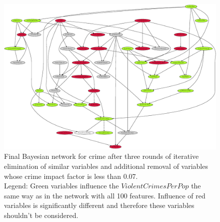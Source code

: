 \begin{hugepage}
\pdfpagewidth
\begin{figure}[h]
    \centering
    \vspace*{-2.5cm}
    \includegraphics[scale=0.83]{fig/round-4_intersection_tolerance-1}
    \caption{Final Bayesian network for crime after three rounds of iterative elimination of similar variables and additional removal of variables whose crime impact factor is less than 0.07.
    \\Legend: Green variables influence the $ViolentCrimesPerPop$ the same way as in the network with all 100 features. Influence of red variables is significantly different and therefore these variables shouldn't be considered.}
    \label{fig:crime_net_round4}
\end{figure}
\end{hugepage}


